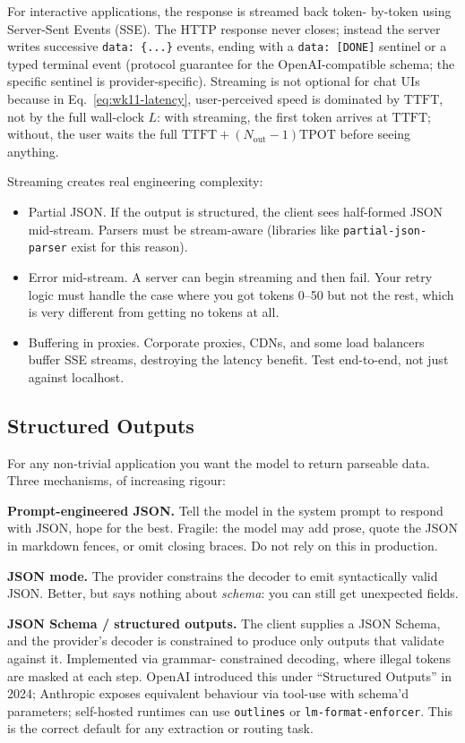 For interactive applications, the response is streamed back token-
by-token using Server-Sent Events (SSE). The HTTP response never
closes; instead the server writes successive \texttt{data: \{...\}}
events, ending with a \texttt{data: [DONE]} sentinel or a typed
terminal event (protocol guarantee for the OpenAI-compatible
schema; the specific sentinel is provider-specific). Streaming is
not optional for chat UIs because in Eq.~\eqref{eq:wk11-latency},
user-perceived speed is dominated by $\mathrm{TTFT}$, not by the
full wall-clock $L$: with streaming, the first token arrives at
$\mathrm{TTFT}$; without, the user waits the full
$\mathrm{TTFT} + (N_\mathrm{out} - 1)\mathrm{TPOT}$ before seeing
anything.

Streaming creates real engineering complexity:
\begin{itemize}
  \item Partial JSON. If the output is structured, the client
        sees half-formed JSON mid-stream. Parsers must be
        stream-aware (libraries like \texttt{partial-json-parser}
        exist for this reason).
  \item Error mid-stream. A server can begin streaming and then
        fail. Your retry logic must handle the case where you got
        tokens 0--50 but not the rest, which is very different
        from getting no tokens at all.
  \item Buffering in proxies. Corporate proxies, CDNs, and some
        load balancers buffer SSE streams, destroying the latency
        benefit. Test end-to-end, not just against localhost.
\end{itemize}

\subsection{Structured Outputs}

For any non-trivial application you want the model to return
parseable data. Three mechanisms, of increasing rigour:

\textbf{Prompt-engineered JSON.} Tell the model in the system
prompt to respond with JSON, hope for the best. Fragile: the
model may add prose, quote the JSON in markdown fences, or omit
closing braces. Do not rely on this in production.

\textbf{JSON mode.} The provider constrains the decoder to emit
syntactically valid JSON. Better, but says nothing about
\emph{schema}: you can still get unexpected fields.

\textbf{JSON Schema / structured outputs.} The client supplies a
JSON Schema, and the provider's decoder is constrained to produce
only outputs that validate against it. Implemented via grammar-
constrained decoding, where illegal tokens are masked at each
step. OpenAI introduced this under ``Structured Outputs'' in
2024; Anthropic exposes equivalent behaviour via tool-use with
schema'd parameters; self-hosted runtimes can use \texttt{outlines}
or \texttt{lm-format-enforcer}. This is the correct default for
any extraction or routing task.

